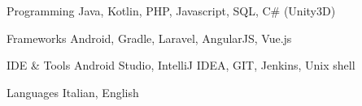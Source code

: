 


\begin{cvskills}


\cvskill
{Programming} %
{Java, Kotlin, PHP, Javascript, SQL, C\# (Unity3D)} %


\cvskill
{Frameworks} %
{Android, Gradle, Laravel, AngularJS, Vue.js} %


\cvskill
{IDE \& Tools} %
{Android Studio, IntelliJ IDEA, GIT, Jenkins, Unix shell} %


\cvskill
{Languages} %
{Italian, English} %


\end{cvskills}